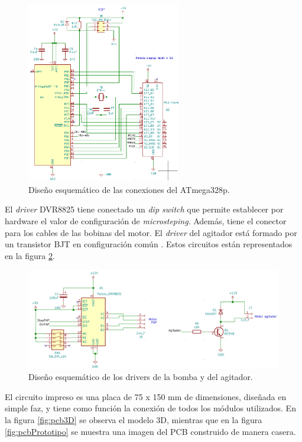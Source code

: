\begin{figure}[htbp]
	\centering
	\includegraphics[width=0.6\textwidth]{./Figures/esquematicoAtmega.png}
	\caption{Diseño esquemático de las conexiones del ATmega328p.}
	\label{fig:esquematicoAtmega}
\end{figure}

El \textit{driver} DVR8825 tiene conectado un \textit{dip switch} que permite establecer por hardware el valor de configuración de \textit{microsteping}. Además, tiene el conector para los cables de las bobinas del motor. El \textit{driver} del agitador está formado por un transistor BJT en configuración común \cite{BOOK:3}. Estos circuitos están representados en la figura \ref{fig:esquematicoMotores}.

\begin{figure}[htbp]
	\centering
	\includegraphics[width=1.0\textwidth]{./Figures/esquematicoMotores.png}
	\caption{Diseño esquemático de los drivers de la bomba y del agitador.}
	\label{fig:esquematicoMotores}
\end{figure}

El circuito impreso es una placa de 75 x 150 mm de dimensiones, diseñada en simple faz, y tiene como función la conexión de todos los módulos utilizados. En la figura \ref{fig:pcb3D} se observa el modelo 3D, mientras que en la figura \ref{fig:pcbPrototipo} se muestra una imagen del PCB construido de manera casera.


